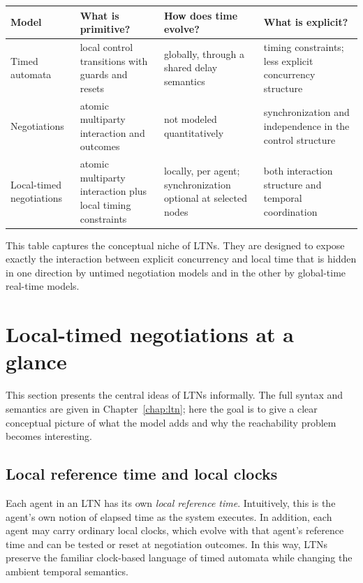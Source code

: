 \begin{center}
\begin{tabular}{p{3.1cm}p{3.6cm}p{3.8cm}p{3.8cm}}
\toprule
\textbf{Model} & \textbf{What is primitive?} & \textbf{How does time evolve?} & \textbf{What is explicit?} \\
\midrule
Timed automata & local control transitions with guards and resets & globally, through a shared delay semantics & timing constraints; less explicit concurrency structure \\
Negotiations & atomic multiparty interaction and outcomes & not modeled quantitatively & synchronization and independence in the control structure \\
Local-timed negotiations & atomic multiparty interaction plus local timing constraints & locally, per agent; synchronization optional at selected nodes & both interaction structure and temporal coordination \\
\bottomrule
\end{tabular}
\end{center}

This table captures the conceptual niche of LTNs. They are designed to expose exactly the interaction between explicit concurrency and local time that is hidden in one direction by untimed negotiation models and in the other by global-time real-time models.


\section{Local-timed negotiations at a glance}
\label{sec:intro-ltns}

This section presents the central ideas of LTNs informally. The full syntax and semantics are given in Chapter~\ref{chap:ltn}; here the goal is to give a clear conceptual picture of what the model adds and why the reachability problem becomes interesting.

\subsection{Local reference time and local clocks}

Each agent in an LTN has its own \emph{local reference time}. Intuitively, this is the agent's own notion of elapsed time as the system executes. In addition, each agent may carry ordinary local clocks, which evolve with that agent's reference time and can be tested or reset at negotiation outcomes. In this way, LTNs preserve the familiar clock-based language of timed automata while changing the ambient temporal semantics.

